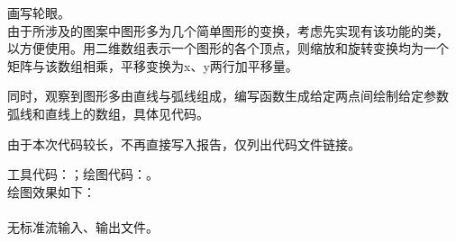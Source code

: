 \documentclass{ctexart}
\begin{document}
\maketitle

\begin{answer}
    画写轮眼。\\

    由于所涉及的图案中图形多为几个简单图形的变换，考虑先实现有该功能的类，
    以方便使用。用二维数组表示一个图形的各个顶点，则缩放和旋转变换均为一个
    矩阵与该数组相乘，平移变换为x、y两行加平移量。

    同时，观察到图形多由直线与弧线组成，编写函数生成给定两点间绘制给定参数
    弧线和直线上的数组，具体见代码。

    由于本次代码较长，不再直接写入报告，仅列出代码文件链接。

    工具代码：；绘图代码：。\\
    绘图效果如下：\\
    \\
    无标准流输入、输出文件。
\end{answer}
\end{document}
